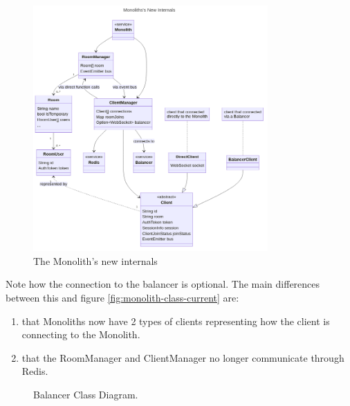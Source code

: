 \begin{figure}[!h]
  \centering
  \includegraphics[width=0.8\textwidth]{Figures/monolith-class-new.png}
  \caption{The Monolith's new internals}
  \label{fig:monolith-class-new}
\end{figure}

Note how the connection to the balancer is optional. The main differences between this and figure \ref{fig:monolith-class-current} are:
\begin{enumerate}
  \item that Monoliths now have 2 types of clients representing how the client is connecting to the Monolith.
  \item that the RoomManager and ClientManager no longer communicate through Redis.
\end{enumerate}


\begin{figure}[!htb]
  \centering
  \caption{\label{Figure::balancer-class} Balancer Class Diagram.}
\end{figure}


